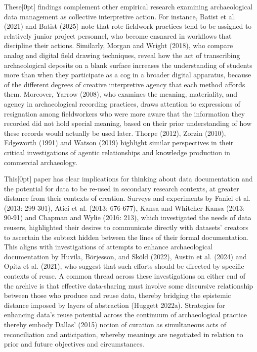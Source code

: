 \documentclass[
]{article}
\newcommand{\paragraphnumber}[1]{\marginnote{\color{lightgray}\tiny{#1}}[0pt]}
\begin{document}
These\paragraphnumber{[45]} findings complement other empirical research
examining archaeological data management as collective interpretive
action. For instance, Batist et al. (2021) and Batist (2025) note that
rote fieldwork practices tend to be assigned to relatively junior
project personnel, who become ensnared in workflows that discipline
their actions. Similarly, Morgan and Wright (2018), who compare analog
and digital field drawing techniques, reveal how the act of transcribing
archaeological deposits on a blank surface increases the understanding
of students more than when they participate as a cog in a broader
digital apparatus, because of the different degrees of creative
interpretive agency that each method affords them. Moreover, Yarrow
(2008), who examines the meaning, materiality, and agency in
archaeological recording practices, draws attention to expressions of
resignation among fieldworkers who were more aware that the information
they recorded did not hold special meaning, based on their prior
understanding of how these records would actually be used later. Thorpe
(2012), Zorzin (2010), Edgeworth (1991) and Watson (2019) highlight
similar perspectives in their critical investigations of agentic
relationships and knowledge production in commercial archaeology.

This\paragraphnumber{[46]} paper has clear implications for thinking
about data documentation and the potential for data to be re-used in
secondary research contexts, at greater distance from their contexts of
creation. Surveys and experiments by Faniel et al. (2013: 299-301),
Atici et al. (2013: 676-677), Kansa and Whitcher Kansa (2013: 90-91) and
Chapman and Wylie (2016: 213), which investigated the needs of data
reusers, highlighted their desires to communicate directly with
datasets' creators to ascertain the subtext hidden between the lines of
their formal documentation. This aligns with investigations of attempts
to enhance archaeological documentation by Huvila, Börjesson, and Sköld
(2022), Austin et al. (2024) and Opitz et al. (2021), who suggest that
such efforts should be directed by specific contexts of reuse. A common
thread across these investigations on either end of the archive is that
effective data-sharing must involve some discursive relationship between
those who produce and reuse data, thereby bridging the epistemic
distance imposed by layers of abstraction (Huggett 2022a). Strategies
for enhancing data's reuse potential across the continuum of
archaeological practice thereby embody Dallas' (2015) notion of curation
as simultaneous acts of reconciliation and anticipation, whereby
meanings are negotiated in relation to prior and future objectives and
circumstances.
\end{document}
